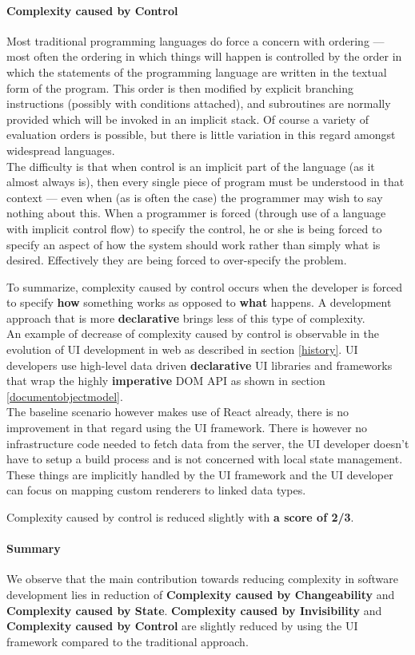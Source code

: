 \paragraph{Complexity caused by Control}
Most traditional programming languages do force a concern with ordering — most often the ordering in which things will happen is controlled by the order in which the statements of the programming language are written in the textual form of the program. This order is then modified by explicit branching instructions (possibly with conditions attached), and subroutines are normally provided which will be invoked in an implicit stack. Of course a variety of evaluation orders is possible, but there is little variation in this regard amongst widespread languages. \\
The difficulty is that when control is an implicit part of the language (as it almost always is), then every single piece of program must be understood in that context — even when (as is often the case) the programmer may wish to say nothing about this. When a programmer is forced (through use of a language with implicit control flow) to specify the control, he or she is being forced to specify an aspect of how the system should work rather than simply what is desired. Effectively they are being forced to over-specify the problem. \citep{outoftarpit}

To summarize, complexity caused by control occurs when the developer is forced to specify \textbf{how} something works as opposed to \textbf{what} happens. A development approach that is more \textbf{declarative} brings less of this type of complexity. \\
An example of decrease of complexity caused by control is observable in the evolution of UI development in web as described in section \ref{history}. UI developers use high-level data driven \textbf{declarative} UI libraries and frameworks that wrap the highly \textbf{imperative} DOM API as shown in section \ref{documentobjectmodel}. \\
The baseline scenario however makes use of React already, there is no improvement in that regard using the UI framework. There is however no infrastructure code needed to fetch data from the server, the UI developer doesn't have to setup a build process and is not concerned with local state management. These things are implicitly handled by the UI framework and the UI developer can focus on mapping custom renderers to linked data types.

Complexity caused by control is reduced slightly with \textbf{a score of 2/3}.

\paragraph{Summary}
We observe that the main contribution towards reducing complexity in software development lies in reduction of \textbf{Complexity caused by Changeability} and \textbf{Complexity caused by State}. \textbf{Complexity caused by Invisibility} and \textbf{Complexity caused by Control} are slightly reduced by using the UI framework compared to the traditional approach.
